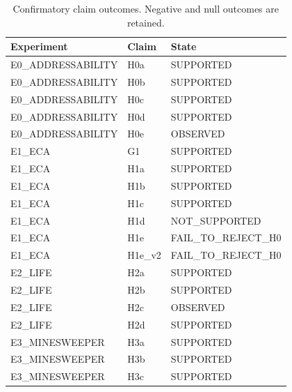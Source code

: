 \begin{table}[t]
\centering
\small
\begin{tabular}{lll}
\toprule
Experiment & Claim & State \\
\midrule
E0\_ADDRESSABILITY & H0a & SUPPORTED \\
E0\_ADDRESSABILITY & H0b & SUPPORTED \\
E0\_ADDRESSABILITY & H0c & SUPPORTED \\
E0\_ADDRESSABILITY & H0d & SUPPORTED \\
E0\_ADDRESSABILITY & H0e & OBSERVED \\
E1\_ECA & G1 & SUPPORTED \\
E1\_ECA & H1a & SUPPORTED \\
E1\_ECA & H1b & SUPPORTED \\
E1\_ECA & H1c & SUPPORTED \\
E1\_ECA & H1d & NOT\_SUPPORTED \\
E1\_ECA & H1e & FAIL\_TO\_REJECT\_H0 \\
E1\_ECA & H1e\_v2 & FAIL\_TO\_REJECT\_H0 \\
E2\_LIFE & H2a & SUPPORTED \\
E2\_LIFE & H2b & SUPPORTED \\
E2\_LIFE & H2c & OBSERVED \\
E2\_LIFE & H2d & SUPPORTED \\
E3\_MINESWEEPER & H3a & SUPPORTED \\
E3\_MINESWEEPER & H3b & SUPPORTED \\
E3\_MINESWEEPER & H3c & SUPPORTED \\
\bottomrule
\end{tabular}
\caption{Confirmatory claim outcomes. Negative and null outcomes are retained.}
\label{tab:claims}
\end{table}
